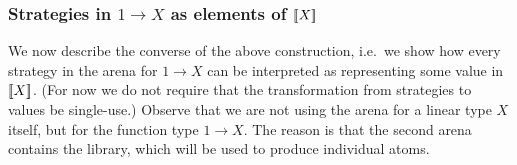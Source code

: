 \subsubsection{Strategies in $1 \to X$ as elements of $[{\kern-0.4ex}[X]{\kern-0.4ex}]$}
\label{sec:strategies-in-1-to-x-as-elements-of-sem-x}
We now describe the converse of the above construction, i.e.~we show how every strategy in the arena for $1 \to X$ can be interpreted as representing some value in $[{\kern-0.4ex}[X]{\kern-0.4ex}]$. (For now we do not require that the transformation from strategies to values be single-use.)
Observe that we are not using the arena for a linear type $X$ itself, but for the function type $1 \to X$. The reason is that the second arena contains the library, which will be used to produce individual atoms. 

